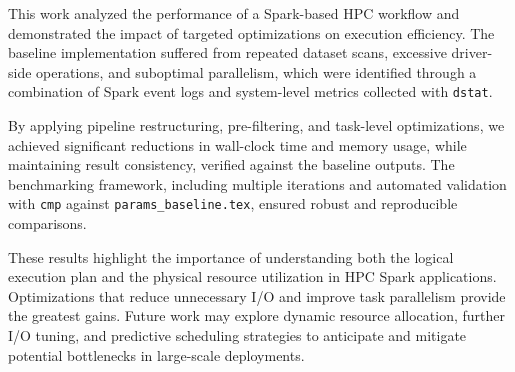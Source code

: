 \documentclass[conference,a4paper]{IEEEtran}
\begin{document}
This work analyzed the performance of a Spark-based HPC workflow and demonstrated
the impact of targeted optimizations on execution efficiency. The baseline
implementation suffered from repeated dataset scans, excessive driver-side
operations, and suboptimal parallelism, which were identified through a
combination of Spark event logs and system-level metrics collected with
\texttt{dstat}.

By applying pipeline restructuring, pre-filtering, and task-level optimizations,
we achieved significant reductions in wall-clock time and memory usage, while
maintaining result consistency, verified against the baseline outputs. The
benchmarking framework, including multiple iterations and automated validation
with \texttt{cmp} against \texttt{params\_baseline.tex}, ensured robust and
reproducible comparisons.

These results highlight the importance of understanding both the logical
execution plan and the physical resource utilization in HPC Spark applications.
Optimizations that reduce unnecessary I/O and improve task parallelism provide
the greatest gains. Future work may explore dynamic resource allocation, further
I/O tuning, and predictive scheduling strategies to anticipate and mitigate
potential bottlenecks in large-scale deployments.
\end{document}
